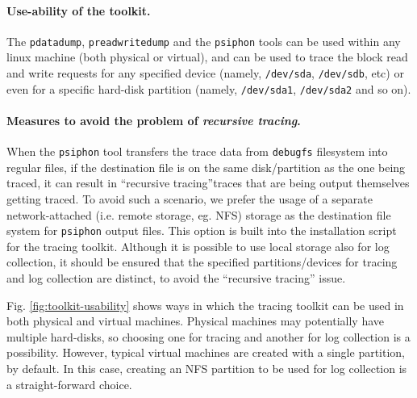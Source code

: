 \paragraph{Use-ability of the toolkit.}
The \texttt{pdatadump}, \texttt{preadwritedump} and the \texttt{psiphon}
tools can be used within any linux machine (both physical or virtual),
and can be used to trace the block read and write requests for any 
specified device (namely, \texttt{/dev/sda}, \texttt{/dev/sdb}, etc)
or even for a specific hard-disk partition (namely, 
\texttt{/dev/sda1}, \texttt{/dev/sda2} and so on). 

\paragraph{Measures to avoid the problem of \textit{recursive tracing}.}
When the \texttt{psiphon} tool transfers the trace data from 
\texttt{debugfs} filesystem into regular files, if the destination file
is on the same disk/partition as the one being traced, it can 
result in ``recursive tracing''\textemdash{}traces that are being output themselves 
getting traced. To avoid such a scenario, we prefer the usage of a separate
network-attached (i.e. remote storage, eg. NFS) storage as the destination 
file system for \texttt{psiphon} output files. 
This option is built into the installation script for
the tracing toolkit. Although it is possible to use local storage also 
for log collection, it should be ensured that the specified partitions/devices
for tracing and log collection are distinct, to avoid the 
``recursive tracing'' issue.


Fig. \ref{fig:toolkit-usability} shows ways in which the tracing toolkit
can be used in both physical and virtual machines. Physical machines may 
potentially have multiple hard-disks, so choosing one for tracing and
another for log collection is a possibility. However, typical virtual
machines are created with a single partition, by default. In this case,
creating an NFS partition to be used for log collection is a
straight-forward choice.

